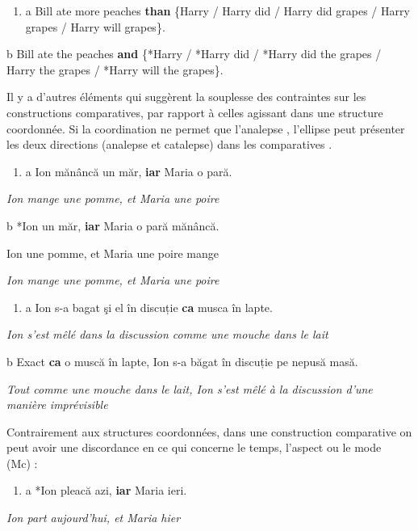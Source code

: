 \begin{enumerate}
\item \label{bkm:Ref289120242}a   Bill ate more peaches \textbf{than} \{Harry / Harry did / Harry did grapes / Harry grapes / Harry will grapes\}.  


\end{enumerate}
  b  Bill ate the peaches \textbf{and} \{*Harry / *Harry did / *Harry did the grapes / Harry the grapes / *Harry will the grapes\}.

Il y a d'autres éléments qui suggèrent la souplesse des contraintes sur les constructions comparatives, par rapport à celles agissant dans une structure coordonnée. Si la coordination ne permet que l'analepse , l'ellipse peut présenter les deux directions (analepse et catalepse) dans les comparatives .


\begin{enumerate}
\item \label{bkm:Ref289120961}a  Ion mănâncă un măr, \textbf{iar} Maria o pară.


\end{enumerate}
{\itshape
Ion mange une pomme, et Maria une poire } 

  b  *Ion un măr, \textbf{iar} Maria o pară mănâncă.

    Ion une pomme, et Maria une poire mange

{\itshape
Ion mange une pomme, et Maria une poire}


\begin{enumerate}
\item \label{bkm:Ref289120973}a  Ion s-a bagat şi el în discuție \textbf{ca} musca în lapte.


\end{enumerate}
{\itshape
Ion s'est mêlé dans la discussion comme une mouche dans le lait } 

  b  Exact \textbf{ca} o muscă în lapte, Ion s-a băgat în discuție pe nepusă masă.

{\itshape
Tout comme une mouche dans le lait, Ion s'est mêlé à la discussion d'une manière imprévisible}

Contrairement aux structures coordonnées, dans une construction comparative on peut avoir une discordance en ce qui concerne le temps, l'aspect ou le mode~ (Mc\citet{Shane2005}) :


\begin{enumerate}
\item a  *Ion pleacă azi, \textbf{iar} Maria ieri.


\end{enumerate}
{\itshape
Ion part aujourd'hui, et Maria hier } 


